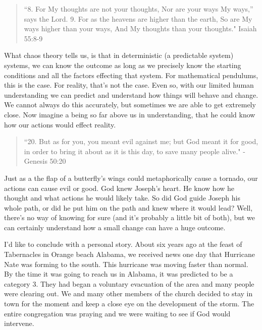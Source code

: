 \documentclass[10pt]{article}
\begin{document}
\begin{multicols}{2}
\begin{quotation}
``8. For My thoughts are not your thoughts, Nor are your ways My ways,” says the Lord. 9. For as the heavens are higher than the earth, So are My ways higher than your ways, And My thoughts than your thoughts." Isaiah 55:8-9
\end{quotation}

What chaos theory tells us, is that in deterministic (a predictable system) systems, we can know the outcome as long as we precisely know the starting conditions and all the factors effecting that system. For mathematical pendulums, this is the case. For reality, that's not the case. Even so, with our limited human understanding we can predict and understand how things will behave and change. We cannot always do this accurately, but sometimes we are able to get extremely close. Now imagine a being so far above us in understanding, that he could know how our actions would effect reality.

\begin{quotation}
``20. But as for you, you meant evil against me; but God meant it for good, in order to bring it about as it is this day, to save many people alive." - Genesis 50:20
\end{quotation}

Just as a the flap of a butterfly's wings could metaphorically cause a tornado, our actions can cause evil or good. God knew Joseph's heart. He know how he thought and what actions he would likely take. So did God guide Joseph his whole path, or did he put him on the path and knew where it would lead? Well, there's no way of knowing for sure (and it's probably a little bit of both), but we can certainly understand how a small change can have a huge outcome.

I'd like to conclude with a personal story. About six years ago at the feast of Tabernacles in Orange beach Alabama, we received news one day that Hurricane Nate was forming to the south. This hurricane was moving faster than normal. By the time it was going to reach us in Alabama, it was predicted to be a category 3. They had began a voluntary evacuation of the area and many people were clearing out. We and many other members of the church decided to stay in town for the moment and keep a close eye on the development of the storm. The entire congregation was praying and we were waiting to see if God would intervene.


\end{multicols}
\end{document}

